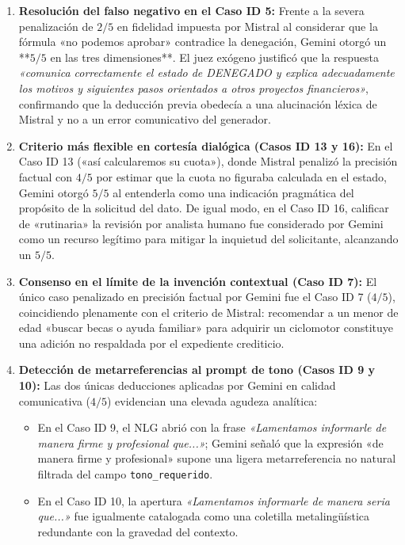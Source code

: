 \documentclass[12pt,a4paper]{report}
\begin{document}
\begin{enumerate}
    \item \textbf{Resolución del falso negativo en el Caso ID 5:} 
    Frente a la severa penalización de $2/5$ en fidelidad impuesta por Mistral al considerar que la fórmula «no podemos aprobar» contradice la denegación, Gemini otorgó un **$5/5$ en las tres dimensiones**. El juez exógeno justificó que la respuesta \textit{«comunica correctamente el estado de DENEGADO y explica adecuadamente los motivos y siguientes pasos orientados a otros proyectos financieros»}, confirmando que la deducción previa obedecía a una alucinación léxica de Mistral y no a un error comunicativo del generador.

    \item \textbf{Criterio más flexible en cortesía dialógica (Casos ID 13 y 16):} 
    En el Caso ID 13 («así calcularemos su cuota»), donde Mistral penalizó la precisión factual con $4/5$ por estimar que la cuota no figuraba calculada en el estado, Gemini otorgó $5/5$ al entenderla como una indicación pragmática del propósito de la solicitud del dato. De igual modo, en el Caso ID 16, calificar de «rutinaria» la revisión por analista humano fue considerado por Gemini como un recurso legítimo para mitigar la inquietud del solicitante, alcanzando un $5/5$.

    \item \textbf{Consenso en el límite de la invención contextual (Caso ID 7):} 
    El único caso penalizado en precisión factual por Gemini fue el Caso ID 7 ($4/5$), coincidiendo plenamente con el criterio de Mistral: recomendar a un menor de edad «buscar becas o ayuda familiar» para adquirir un ciclomotor constituye una adición no respaldada por el expediente crediticio.

    \item \textbf{Detección de metarreferencias al prompt de tono (Casos ID 9 y 10):} 
    Las dos únicas deducciones aplicadas por Gemini en calidad comunicativa ($4/5$) evidencian una elevada agudeza analítica:
    \begin{itemize}
        \item En el Caso ID 9, el NLG abrió con la frase \textit{«Lamentamos informarle de manera firme y profesional que...»}; Gemini señaló que la expresión «de manera firme y profesional» supone una ligera metarreferencia no natural filtrada del campo \texttt{tono\_requerido}.
        \item En el Caso ID 10, la apertura \textit{«Lamentamos informarle de manera seria que...»} fue igualmente catalogada como una coletilla metalingüística redundante con la gravedad del contexto.
    \end{itemize}
\end{enumerate}
\end{document}
